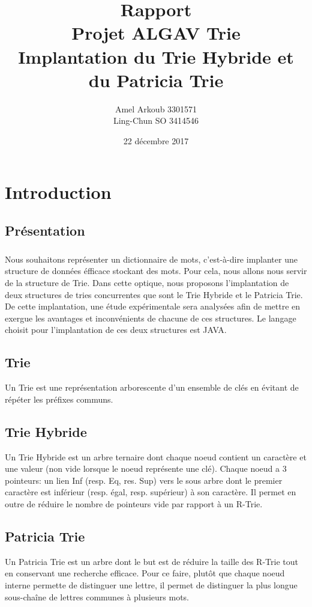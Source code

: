 \documentclass[a4paper,12pt]{report}
\title{\Huge Rapport \\ Projet ALGAV Trie \\ \large Implantation du Trie Hybride et du Patricia Trie}
\author{Amel Arkoub 3301571 \\ Ling-Chun SO 3414546}
\date{22 décembre 2017}
\begin{document}
\maketitle

\tableofcontents
\newpage

\chapter{Introduction}
\section*{Présentation}
\paragraph*{}
Nous souhaitons représenter un dictionnaire de mots, c'est-à-dire implanter une structure de
données éfficace stockant des mots. Pour cela, nous allons nous servir de la structure de Trie.
Dans cette optique, nous proposons l'implantation de deux structures de tries concurrentes que sont le Trie Hybride
et le Patricia Trie. De cette implantation, une étude expérimentale sera analysées afin de mettre en exergue
les avantages et inconvénients de chacune de ces structures. Le langage choisit pour l'implantation de ces deux
structures est JAVA.

\section*{Trie}
Un Trie est une représentation arborescente d'un ensemble de clés en évitant de répéter les préfixes communs.

\section*{Trie Hybride}
Un Trie Hybride est un arbre ternaire dont chaque noeud contient un caractère et une valeur (non vide
lorsque le noeud représente une clé). Chaque noeud a 3 pointeurs: un lien Inf (resp. Eq, res. Sup) vers le sous
arbre dont le premier caractère est inférieur (resp. égal, resp. supérieur) à son caractère. Il permet en outre
de réduire le nombre de pointeurs vide par rapport à un R-Trie.

\section*{Patricia Trie}
Un Patricia Trie est un arbre dont le but est de réduire la taille des R-Trie tout en conservant une recherche
efficace. Pour ce faire, plutôt que chaque noeud interne permette de distinguer une lettre, il permet de distinguer
la plus longue sous-chaîne de lettres communes à plusieurs mots.
\end{document}
